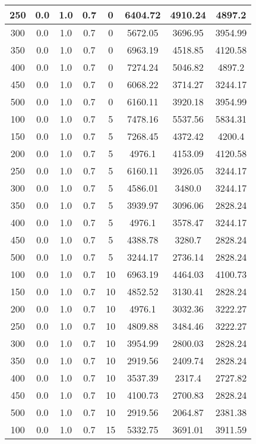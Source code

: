 \documentclass[a4paper, 12pt]{extreport}
\begin{document}
\begin{itemize}
\begin{longtable}{|c|c|c|c|c|c|c|c|}
			250 & 0.0 & 1.0 & 0.7 & 0 & 6404.72 & 4910.24 & 4897.2 \\\hline
			300 & 0.0 & 1.0 & 0.7 & 0 & 5672.05 & 3696.95 & 3954.99 \\\hline
			350 & 0.0 & 1.0 & 0.7 & 0 & 6963.19 & 4518.85 & 4120.58 \\\hline
			400 & 0.0 & 1.0 & 0.7 & 0 & 7274.24 & 5046.82 & 4897.2 \\\hline
			450 & 0.0 & 1.0 & 0.7 & 0 & 6068.22 & 3714.27 & 3244.17 \\\hline
			500 & 0.0 & 1.0 & 0.7 & 0 & 6160.11 & 3920.18 & 3954.99 \\\hline
			100 & 0.0 & 1.0 & 0.7 & 5 & 7478.16 & 5537.56 & 5834.31 \\\hline
			150 & 0.0 & 1.0 & 0.7 & 5 & 7268.45 & 4372.42 & 4200.4 \\\hline
			200 & 0.0 & 1.0 & 0.7 & 5 & 4976.1 & 4153.09 & 4120.58 \\\hline
			250 & 0.0 & 1.0 & 0.7 & 5 & 6160.11 & 3926.05 & 3244.17 \\\hline
			300 & 0.0 & 1.0 & 0.7 & 5 & 4586.01 & 3480.0 & 3244.17 \\\hline
			350 & 0.0 & 1.0 & 0.7 & 5 & 3939.97 & 3096.06 & 2828.24 \\\hline
			400 & 0.0 & 1.0 & 0.7 & 5 & 4976.1 & 3578.47 & 3244.17 \\\hline
			450 & 0.0 & 1.0 & 0.7 & 5 & 4388.78 & 3280.7 & 2828.24 \\\hline
			500 & 0.0 & 1.0 & 0.7 & 5 & 3244.17 & 2736.14 & 2828.24 \\\hline
			100 & 0.0 & 1.0 & 0.7 & 10 & 6963.19 & 4464.03 & 4100.73 \\\hline
			150 & 0.0 & 1.0 & 0.7 & 10 & 4852.52 & 3130.41 & 2828.24 \\\hline
			200 & 0.0 & 1.0 & 0.7 & 10 & 4976.1 & 3032.36 & 3222.27 \\\hline
			250 & 0.0 & 1.0 & 0.7 & 10 & 4809.88 & 3484.46 & 3222.27 \\\hline
			300 & 0.0 & 1.0 & 0.7 & 10 & 3954.99 & 2800.03 & 2828.24 \\\hline
			350 & 0.0 & 1.0 & 0.7 & 10 & 2919.56 & 2409.74 & 2828.24 \\\hline
			400 & 0.0 & 1.0 & 0.7 & 10 & 3537.39 & 2317.4 & 2727.82 \\\hline
			450 & 0.0 & 1.0 & 0.7 & 10 & 4100.73 & 2700.83 & 2828.24 \\\hline
			500 & 0.0 & 1.0 & 0.7 & 10 & 2919.56 & 2064.87 & 2381.38 \\\hline
			100 & 0.0 & 1.0 & 0.7 & 15 & 5332.75 & 3691.01 & 3911.59 \\\hline

\end{longtable}
\end{itemize}
\end{document}
